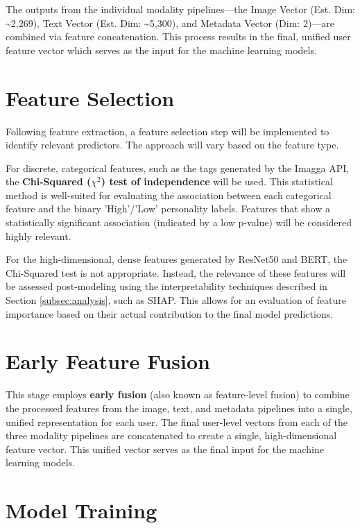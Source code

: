 The outputs from the individual modality pipelines—the Image Vector (Est. Dim: \textasciitilde2,269), Text Vector (Est. Dim: \textasciitilde5,300), and Metadata Vector (Dim: 2)—are combined via feature concatenation. This process results in the final, unified user feature vector which serves as the input for the machine learning models.

\section{Feature Selection}
Following feature extraction, a feature selection step will be implemented to identify relevant predictors. The approach will vary based on the feature type.

For discrete, categorical features, such as the tags generated by the Imagga API, the \textbf{Chi-Squared ($\chi^2$) test of independence} will be used. This statistical method is well-suited for evaluating the association between each categorical feature and the binary 'High'/'Low' personality labels. Features that show a statistically significant association (indicated by a low p-value) will be considered highly relevant.

For the high-dimensional, dense features generated by ResNet50 and BERT, the Chi-Squared test is not appropriate. Instead, the relevance of these features will be assessed post-modeling using the interpretability techniques described in Section \ref{subsec:analysis}, such as SHAP. This allows for an evaluation of feature importance based on their actual contribution to the final model predictions.

\section{Early Feature Fusion}
\label{subsec:fusion}
This stage employs \textbf{early fusion} (also known as feature-level fusion) to combine the processed features from the image, text, and metadata pipelines into a single, unified representation for each user. The final user-level vectors from each of the three modality pipelines are concatenated to create a single, high-dimensional feature vector. This unified vector serves as the final input for the machine learning models.

\section{Model Training}
\label{subsec:models}

